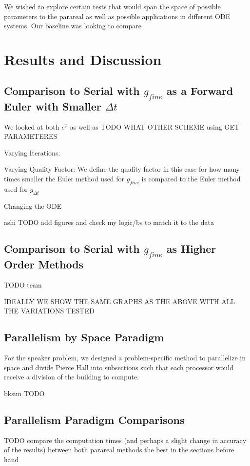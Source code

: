 \documentclass[letterpaper,twocolumn,11pt]{article}
\begin{document}
We wished to explore certain tests that would span the space of possible
parameters to the parareal as well as possible applications in different ODE
systems. Our baseline was looking to compare 

\section{Results and Discussion}

\subsection{Comparison to Serial with $g_{fine}$ as a Forward Euler with
Smaller $\Delta t$}

We looked at both $e^x$ as well as TODO WHAT OTHER SCHEME using GET PARAMETERES

Varying Iterations:

Varying Quality Factor:
We define the quality factor in this case for how many times smaller the Euler method used for $g_{fine}$ is compared to the Euler method used for $g_{\Delta t}$

Changing the ODE

ashi TODO add figures and check my logic/bs to match it to the data

\subsection{Comparison to Serial with $g_{fine}$ as Higher Order Methods}

TODO team

IDEALLY WE SHOW THE SAME GRAPHS AS THE ABOVE WITH ALL THE VARIATIONS TESTED

\subsection{Parallelism by Space Paradigm}

For the speaker problem, we designed a problem-specific method to parallelize in space and divide Pierce Hall into subsections such that each processor would receive a division of the building to compute.

bksim TODO

\subsection{Parallelism Paradigm Comparisons}

TODO compare the computation times (and perhaps a slight change in accuracy of the results) between both parareal methods the best in the sections before hand
\end{document}
